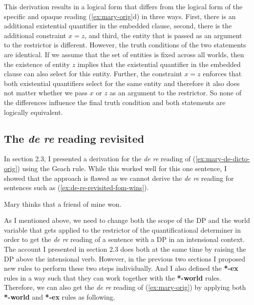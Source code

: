 \documentclass[parskip=half]{scrartcl}
\begin{document}
\normalsize

\vspace{1cm}

This derivation results in a logical form that differs from the logical form of the specific and opaque reading (\ref{ex:mary-orig}d) in three ways. First, there is an additional existential quantifier in the embedded clause, second, there is the additional constraint $x =z$, and third, the entity that is passed as an argument to the restrictor is different. However, the truth conditions of the two statements are identical. If we assume that the set of entities is fixed across all worlds, then  the existence of entity $z$ implies that the existential quantifier in the embedded clause can also select for this entity. Further, the constraint $x =z$ enforces that both existential quantifiers select for the same entity and therefore it also does not matter whether we pass $x$ or $z$ as an argument to the restrictor. So none of the differences influence the final truth condition and both statements are logically equivalent. 


\subsection{The \textit{de re} reading revisited}

In section 2.3, I presented a derivation for the \textit{de re} reading of  (\ref{ex:mary-de-dicto-orig}) using the Geach rule. While this worked well for
this one sentence, I showed that the approach is flawed as we cannot derive the  \textit{de re} reading for sentences such as (\ref{ex:de-re-revisited-fom-wins}).

\begin{exe}
\ex \label{ex:de-re-revisited-fom-wins} Mary thinks that a friend of mine won.
\end{exe}

As I mentioned above, we need to change both the scope of the DP and the world variable that gets applied to the restrictor of the quantificational determiner in order to get the \textit{de re} reading of a sentence with a DP in an intensional context.
The account I presented in section 2.3 does both at the same time by raising the DP above the intensional verb. However, in the previous two sections I proposed new
rules to perform these two steps individually. And I also defined the \textbf{*-ex} rules in a way
such that they can work together with the \textbf{*-world} rules. Therefore, we can also get the \textit{de re} reading of  (\ref{ex:mary-orig}) by applying both
\textbf{*-world} and \textbf{*-ex} rules as following.
\end{document}
